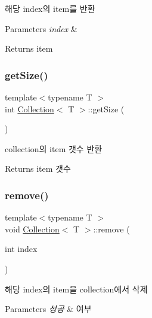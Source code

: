 해당 index의 item를 반환 
\begin{DoxyParams}{Parameters}
{\em index} & \\
\hline
\end{DoxyParams}
\begin{DoxyReturn}{Returns}
item 
\end{DoxyReturn}
\mbox{\label{class_collection_a2fc76ab0d838768768ccb5df10aee711}} 
\subsubsection{\texorpdfstring{get\+Size()}{getSize()}}
{\footnotesize\ttfamily template$<$typename T $>$ \\
int \mbox{\hyperlink{class_collection}{Collection}}$<$ T $>$\+::get\+Size (\begin{DoxyParamCaption}{ }\end{DoxyParamCaption})}

collection의 item 갯수 반환 \begin{DoxyReturn}{Returns}
item 갯수 
\end{DoxyReturn}
\mbox{\label{class_collection_a11e03bd78c5b0234fe075b69f776b800}} 
\subsubsection{\texorpdfstring{remove()}{remove()}\hspace{0.1cm}{\footnotesize\ttfamily [1/2]}}
{\footnotesize\ttfamily template$<$typename T $>$ \\
void \mbox{\hyperlink{class_collection}{Collection}}$<$ T $>$\+::remove (\begin{DoxyParamCaption}\item[{int}]{index }\end{DoxyParamCaption})}

해당 index의 item을 collection에서 삭제 
\begin{DoxyParams}{Parameters}
{\em 성공} & 여부 \\
\hline
\end{DoxyParams}
\mbox{\label{class_collection_a6d5b06e5d2528c1251a5eb8b79ce756b}} 
